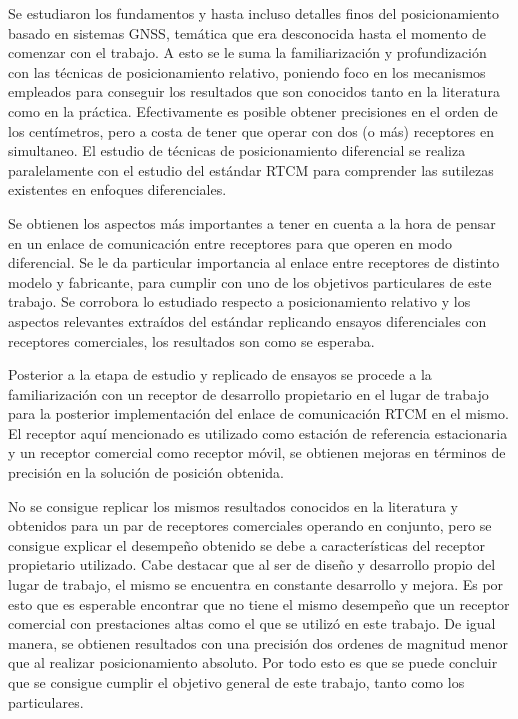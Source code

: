 \documentclass[a4paper,12pt,oneside,onecolumn,final,openright]{book}%
\begin{document}
	Se estudiaron los fundamentos y hasta incluso detalles finos del posicionamiento basado en sistemas GNSS, temática que era desconocida hasta el momento de comenzar con el trabajo. A esto se le suma la familiarización y profundización con las técnicas de posicionamiento relativo, poniendo foco en los mecanismos empleados para conseguir los resultados que son conocidos tanto en la literatura como en la práctica. Efectivamente es posible obtener precisiones en el orden de los centímetros, pero a costa de tener que operar con dos (o más) receptores en simultaneo. El estudio de técnicas de posicionamiento diferencial se realiza paralelamente con el estudio del estándar RTCM para comprender las sutilezas existentes en enfoques diferenciales.
	
	Se obtienen los aspectos más importantes a tener en cuenta a la hora de pensar en un enlace de comunicación entre receptores para que operen en modo diferencial. Se le da particular importancia al enlace entre receptores de distinto modelo y fabricante, para cumplir con uno de los objetivos particulares de este trabajo. Se corrobora lo estudiado respecto a posicionamiento relativo y los aspectos relevantes extraídos del estándar replicando ensayos diferenciales con receptores comerciales, los resultados son como se esperaba. 
	
	Posterior a la etapa de estudio y replicado de ensayos se procede a la familiarización con un receptor de desarrollo propietario en el lugar de trabajo para la posterior implementación del enlace de comunicación RTCM en el mismo. El receptor aquí mencionado es utilizado como estación de referencia estacionaria y un receptor comercial como receptor móvil, se obtienen mejoras en términos de precisión en la solución de posición obtenida. 
	
	No se consigue replicar los mismos resultados conocidos en la literatura y obtenidos para un par de receptores comerciales operando en conjunto, pero se consigue explicar el desempeño obtenido se debe a características del receptor propietario utilizado. Cabe destacar que al ser de diseño y desarrollo propio del lugar de trabajo, el mismo se encuentra en constante desarrollo y mejora. Es por esto que es esperable encontrar que no tiene el mismo desempeño que un receptor comercial con prestaciones altas como el que se utilizó en este trabajo. De igual manera, se obtienen resultados con una precisión dos ordenes de magnitud menor que al realizar posicionamiento absoluto. Por todo esto es que se puede concluir que se consigue cumplir el objetivo general de este trabajo, tanto como los particulares. 
	
\end{document}
